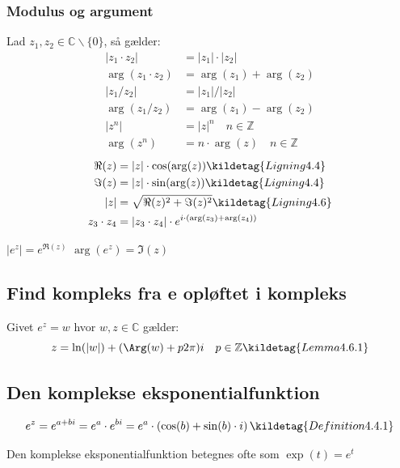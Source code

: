 \subsubsection{Modulus og argument}
Lad $z_1, z_2 \in \mathbb{C} \backslash \{ 0 \}$, så gælder:
\begin{align*}
    |z_1 \cdot z_2| &= |z_1| \cdot |z_2| \\
    \arg(z_1 \cdot z_2) &= \arg(z_1) + \arg(z_2) \\
    |z_1 / z_2| &= |z_1| / |z_2| \\
    \arg(z_1 / z_2) &= \arg(z_1) - \arg(z_2) \\
    |z^n| &= |z|^n \quad n \in \mathbb{Z} \\
    \arg(z^n) &= n \cdot \arg(z) \quad n \in \mathbb{Z}
\end{align*}
\begin{align*}
    \Re(z) &= |z| \cdot \cos(\arg(z)) \kildetag{Ligning 4.4} \\
    \Im(z) &= |z| \cdot \sin(\arg(z)) \kildetag{Ligning 4.4} \\
    |z| &= \sqrt{\Re(z)^2 + \Im(z)^2} \kildetag{Ligning 4.6} \\
    z_3 \cdot z_4 &= |z_3 \cdot z_4| \cdot e^{i \cdot (\arg(z_3) + \arg(z_4))}
\end{align*}

\begin{center}
    $|e^z| = e^{\Re(z)}$ \qquad
    $\arg(e^{z}) = \Im(z)$
\end{center}



\subsection{Find kompleks fra e opløftet i kompleks}
Givet $e^z = w$ hvor $w, z \in \mathbb{C}$ gælder:
\[
    z = \ln(|w|) + (\Arg(w) + p2\pi) i \quad p \in \mathbb{Z} \kildetag{Lemma 4.6.1}
\]


\subsection{Den komplekse eksponentialfunktion}
\[
    e^z = e^{a + bi} = e^a \cdot e^{bi} = e^a \cdot \left(\cos(b) + \sin(b) \cdot i \right) \kildetag{Definition 4.4.1}
\]

Den komplekse eksponentialfunktion betegnes ofte som \(\exp(t)= e^t\)


